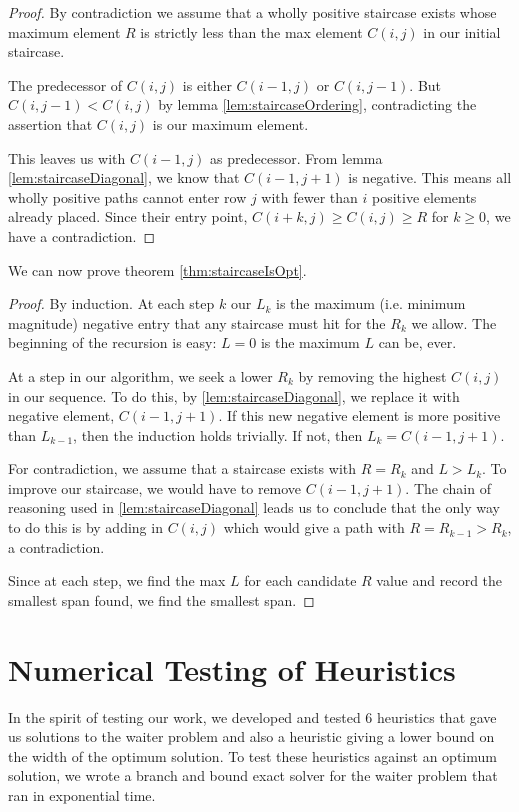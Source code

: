 \begin{proof}
By contradiction we assume that a wholly positive staircase exists whose maximum element $R$ is strictly less than the max element $C(i,j)$ in our initial staircase.

The predecessor of $C(i,j)$ is either $C(i-1,j)$ or $C(i,j-1)$.  But $C(i,j-1) < C(i,j)$ by lemma \ref{lem:staircaseOrdering}, contradicting the assertion that $C(i,j)$ is our maximum element.  

This leaves us with $C(i-1,j)$ as predecessor.  From lemma \ref{lem:staircaseDiagonal}, we know that $C(i-1,j+1)$ is negative. This means all wholly positive paths cannot enter row $j$ with fewer than $i$ positive elements already placed.  Since their entry point, $C(i+k,j) \geq C(i,j) \geq R$ for $k \geq 0$, we have a contradiction.
\end{proof}

We can now prove theorem \ref{thm:staircaseIsOpt}.

\begin{proof}
By induction. At each step $k$ our $L_k$ is the maximum (i.e. minimum magnitude) negative entry that any staircase must hit for the $R_k$ we allow.  The beginning of the recursion is easy: $L=0$ is the maximum $L$ can be, ever.  

At a step in our algorithm, we seek a lower $R_k$ by removing the highest $C(i,j)$ in our sequence.  To do this, by \ref{lem:staircaseDiagonal}, we replace it with negative element, $C(i-1,j+1)$. If this new negative element is more positive than $L_{k-1}$, then the induction holds trivially.  If not, then $L_k = C(i-1,j+1)$.  

For contradiction, we assume that a staircase exists with $R = R_k$ and $L > L_k$. To improve our staircase, we would have to remove $C(i-1,j+1)$.  The chain of reasoning used in \ref{lem:staircaseDiagonal} leads us to conclude that the only way to do this is by adding in $C(i,j)$ which would give a path with $R = R_{k-1} > R_k$, a contradiction.

Since at each step, we find the max $L$ for each candidate $R$ value and record the smallest span found, we find the smallest span.
\end{proof}

\section{Numerical Testing of Heuristics}

In the spirit of testing our work, we developed and tested 6 heuristics that gave us solutions to the waiter problem and also a heuristic giving a lower bound on the width of the optimum solution.  To test these heuristics against an optimum solution, we wrote a branch and bound exact solver for the waiter problem that ran in exponential time.

